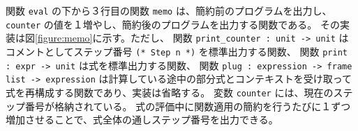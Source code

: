 関数 \texttt{eval} の下から３行目の関数 \texttt{memo} は、簡約前のプログラムを出力し、
\texttt{counter} の値を１増やし、簡約後のプログラムを出力する関数である。
その実装は図\ref{figure:memo}に示す。ただし、
関数 \texttt{print\_counter :\ unit -> unit} はコメントとしてステップ番号
\texttt{(* Step n *)} を標準出力する関数、
関数 \texttt{print :\ expr -> unit} は式を標準出力する関数、
関数 \texttt{plug :\ expression -> frame list -> expression}
は計算している途中の部分式とコンテキストを受け取って式を再構成する関数であり、実装は省略する。
変数 \texttt{counter} には、現在のステップ番号が格納されている。
式の評価中に関数適用の簡約を行うたびに１ずつ増加させることで、式全体の通しステップ番号を出力できる。
